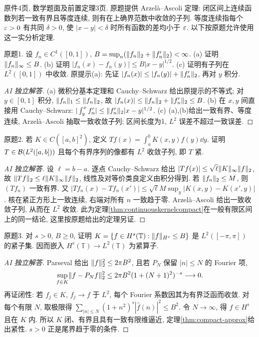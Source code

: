 \label{sec:ps10}
原件4页, 数学题面及前置定理3页. 原题提供 Arzelà--Ascoli 定理: 闭区间上连续函数列若一致有界且等度连续, 则有在上确界范数中收敛的子列. 等度连续指每个 $\varepsilon>0$ 有共同 $\delta>0$, 使 $|x-y|<\delta$ 时所有函数的差均小于 $\varepsilon$. 以下按原题允许使用这一实分析定理.
\begin{exercise}\label{ps10:1}
原题1. 设 $f_n\in C^1([0,1])$, $B=\sup_n(\lVert f_n\rVert_2+\lVert f_n'\rVert_2)<\infty$. (a) 证明 $\lVert f_n\rVert_\infty\le B$. (b) 证明 $|f_n(x)-f_n(y)|\le B|x-y|^{1/2}$. (c) 证明有子列在 $L^2([0,1])$ 中收敛. 原提示(a): 先证 $|f_n(x)|\le|f_n(y)|+\lVert f_n'\rVert_2$, 再对 $y$ 积分.
\end{exercise}
\begin{proof}[AI 独立解答]
(a) 微积分基本定理和 Cauchy--Schwarz 给出原提示的不等式; 对 $y\in[0,1]$ 积分, $\lVert f_n\rVert_1\le\lVert f_n\rVert_2$, 故 $|f_n(x)|\le\lVert f_n\rVert_2+\lVert f_n'\rVert_2\le B$. (b) 在 $x,y$ 间直接用 Cauchy--Schwarz: $|\int_y^x f_n'|\le\lVert f_n'\rVert_2|x-y|^{1/2}$. (c) (a),(b)给出一致有界、等度连续, Arzelà--Ascoli 抽取一致收敛子列; 区间长度为1, $L^2$ 误差不超过一致误差.
\end{proof}
\begin{exercise}\label{ps10:2}
原题2. 若 $K\in C([a,b]^2)$, 定义 $Tf(x)=\int_a^bK(x,y)f(y)\dd y$. 证明 $T\in\mathcal B(L^2([a,b]))$ 且每个有界序列的像都有 $L^2$ 收敛子列, 即 $T$ 紧.
\end{exercise}
\begin{proof}[AI 独立解答]
设 $\ell=b-a$. 逐点 Cauchy--Schwarz 给出 $|Tf(x)|\le\sqrt\ell\lVert K\rVert_\infty\lVert f\rVert_2$, 故 $\lVert Tf\rVert_2\le\ell\lVert K\rVert_\infty\lVert f\rVert_2$, 线性及对等价类良定义由积分得到. 若 $\lVert f_n\rVert_2\le M$, 则 $(Tf_n)$ 一致有界. 又
$|Tf_n(x)-Tf_n(x')|\le\sqrt\ell M\sup_y|K(x,y)-K(x',y)|$. 核在紧正方形上一致连续, 右端对所有 $n$ 一致趋于零. Arzelà--Ascoli 给出一致收敛子列, 从而在 $L^2$ 收敛. 此为定理\ref{thm:continuouskernelcompact}在一般有限区间上的同一结论, 这里按原题给出的定理另证.
\end{proof}
\begin{exercise}\label{ps10:3}
原题3. 对 $s>0$, $B\ge0$, 证明 $K=\{f\in H^s(\mathbb T):\lVert f\rVert_{H^s}\le B\}$ 是 $L^2([-\pi,\pi])$ 的紧子集. 因而嵌入 $H^s(\mathbb T)\to L^2(\mathbb T)$ 为紧算子.
\end{exercise}
\begin{proof}[AI 独立解答]
Parseval 给出 $\lVert f\rVert_2^2\le2\pi B^2$, 且若 $P_N$ 保留 $|n|\le N$ 的 Fourier 项,
\[
\sup_{f\in K}\lVert f-P_Nf\rVert_2^2\le2\pi B^2(1+(N+1)^2)^{-s}\longrightarrow0.
\]
再证闭性: 若 $f_j\in K$, $f_j\to f$ 于 $L^2$, 每个 Fourier 系数因其为有界泛函而收敛. 对每个有限 $N$, 取极限得 $\sum_{|n|\le N}(1+n^2)^s|\widehat f(n)|^2\le B^2$. 令 $N\to\infty$, 得 $f\in H^s$ 且在 $K$ 内. 所以 $K$ 闭、有界且具有一致有限维逼近, 定理\ref{thm:compact-approx}给出紧性. $s>0$ 正是尾界趋于零的条件.
\end{proof}
